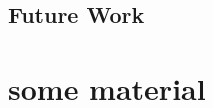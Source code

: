\documentclass[mscthesis]{usiinfthesis}
\begin{document}
\section{Future Work}
\label{ch:conc_work}

\nocite{*}

\appendix %

\chapter{some material}

\backmatter


%
%
%
%
%

%


\end{document}

